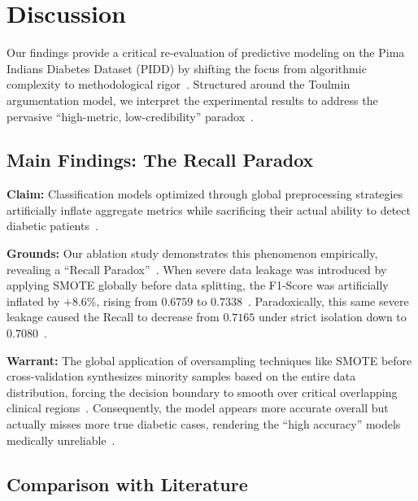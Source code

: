 \documentclass[3p,twocolumn]{elsarticle}
\begin{document}

\section{Discussion}

Our findings provide a critical re-evaluation of predictive modeling on the Pima Indians Diabetes Dataset (PIDD) by shifting the focus from algorithmic complexity to methodological rigor~\cite{Wen2024Leakage}. Structured around the Toulmin argumentation model, we interpret the experimental results to address the pervasive ``high-metric, low-credibility'' paradox~\cite{Sali2025}.

\subsection{Main Findings: The Recall Paradox}

\textbf{Claim:} Classification models optimized through global preprocessing strategies artificially inflate aggregate metrics while sacrificing their actual ability to detect diabetic patients~\cite{Wen2024Leakage}.

\textbf{Grounds:} Our ablation study demonstrates this phenomenon empirically, revealing a ``Recall Paradox''~\cite{Kapoor2024Leakage}. When severe data leakage was introduced by applying SMOTE globally before data splitting, the F1-Score was artificially inflated by $+8.6\%$, rising from $0.6759$ to $0.7338$~\cite{Kapoor2024Leakage}. Paradoxically, this same severe leakage caused the Recall to decrease from $0.7165$ under strict isolation down to $0.7080$~\cite{Kapoor2024Leakage}.

\textbf{Warrant:} The global application of oversampling techniques like SMOTE before cross-validation synthesizes minority samples based on the entire data distribution, forcing the decision boundary to smooth over critical overlapping clinical regions~\cite{Chawla2002}. Consequently, the model appears more accurate overall but actually misses more true diabetic cases, rendering the ``high accuracy'' models medically unreliable~\cite{Sali2025}.

\subsection{Comparison with Literature}
\end{document}
